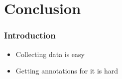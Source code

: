 \section{Conclusion}
\begin{frame}
	\frametitle{Introduction}
	\begin{itemize}
		\item Collecting data is easy
		\item Getting annotations for it is hard
	\end{itemize}
\end{frame}

